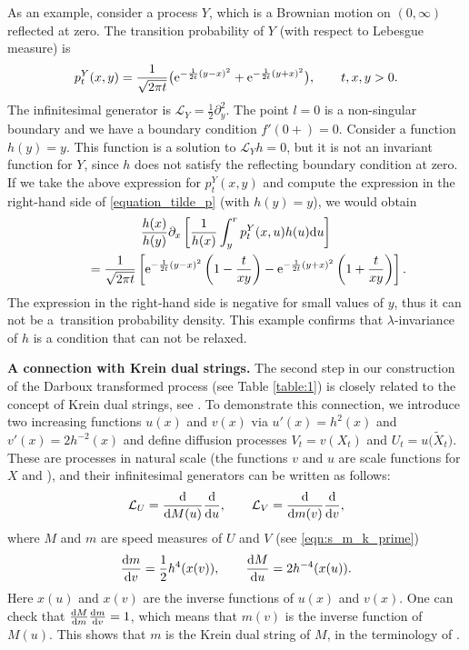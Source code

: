 \documentclass[10pt,a4paper]{amsart}
\numberwithin{equation}{section}
\theoremstyle{definition}
\def\L{{\mathcal L}}
\def\d{{\textnormal d}}
\begin{document}
 As an example, consider a process $Y$, which is a Brownian motion on $(0,\infty)$ reflected at zero. The transition probability of $Y$ (with respect to Lebesgue measure) is
\[
p_t^Y(x,y)=\frac{1}{\sqrt{2\pi t}} \bigl({\rm e}^{-\frac{1}{2t}(y-x)^2}+{\rm e}^{-\frac{1}{2t}(y+x)^2}\bigr), \qquad t,x,y>0.
\]
The infinitesimal generator is $\L_Y=\frac{1}{2} \partial_y^2$. The point $l=0$ is a non-singular boundary and we have a boundary condition $f'(0+)=0$. Consider a function $h(y)=y$. This function is a solution to $\L_Y h = 0$, but it is not an invariant function for $Y$, since $h$ does not satisfy the reflecting boundary condition at zero. If we take the above expression for $p^Y_t(x,y)$ and compute the expression in the right-hand side of \eqref{equation_tilde_p} (with $h(y)=y$), we would obtain
\begin{gather*}
\frac{h(x)}{h(y)} \partial_{x}
\left[ \frac{1}{h(x)} \int_{y}^r p^{Y}_t(x,u) h(u) \d u \right]\\
\qquad= \frac{1}{\sqrt{2\pi t}}
\left[{\rm e}^{-\frac{1}{2t}(y-x)^2}\left(1-\frac{t}{xy}\right)-{\rm e}^{-\frac{1}{2t}(y+x)^2}\left(1+\frac{t}{xy}\right)\right].
\end{gather*}
The expression in the right-hand side is negative for small values of $y$, thus it can not be a~transition probability density. This example confirms that $\lambda$-invariance of $h$ is a condition that can not be relaxed.

{\bf A connection with Krein dual strings.}
The second step in our construction of the Darboux transformed process (see Table \ref{table:1}) is closely related to the concept of Krein dual strings, see \cite{Comtet_2011,Kotani_1982}. To demonstrate this connection, we introduce two increasing functions $u(x)$ and $v(x)$ via
$u'(x)=h^2(x)$ and $v'(x)=2 h^{-2}(x)$
and define diffusion processes $V_t=v(X_t)$ and $U_t=u\bigl(\widetilde X_t\bigr)$. These are processes in natural scale (the functions $v$ and $u$ are scale functions for $X$ and ), and their infinitesimal generators can be written as follows:
\[
\L_U=\frac{\d}{\d M(u)} \frac{\d}{\d u}, \qquad \L_V=\frac{\d}{\d m(v)} \frac{\d}{\d v},
\]
where $M$ and $m$ are speed measures of $U$ and $V$ (see \eqref{eqn:s_m_k_prime})
\[
\frac{\d m}{\d v}=\frac{1}{2} h^{4}(x(v)), \qquad
\frac{\d M}{\d u}=2 h^{-4}(x(u)).
\]
Here $x(u)$ and $x(v)$ are the inverse functions of $u(x)$ and $v(x)$. One can check that
$
\frac{\d M}{\d m} \frac{\d m}{\d v}=1$,
which means that $m(v)$ is the inverse function of $M(u)$. This shows that $m$ is the Krein dual string of $M$, in the terminology of \cite{Comtet_2011,Kotani_1982}.
\end{document}
